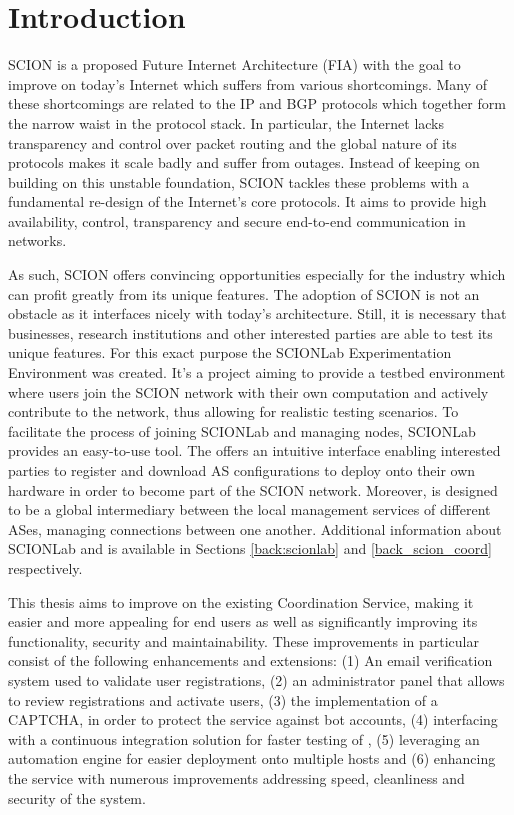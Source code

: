 \chapter{Introduction}

 SCION \cite{scion_book} is a proposed Future Internet Architecture (FIA) with the goal to improve on today's Internet which suffers from various shortcomings. Many of these shortcomings are related to the IP and BGP protocols which together form the narrow waist in the protocol stack. In particular, the Internet lacks transparency and control over packet routing and the global nature of its protocols makes it scale badly and suffer from outages. Instead of keeping on building on this unstable foundation, SCION tackles these problems with a fundamental re-design of the Internet's core protocols. It aims to provide 
 high availability, control, transparency and secure end-to-end communication in networks. \cite{scion_5yrs}
 
 As such, SCION offers convincing opportunities especially for the industry which can profit greatly from its unique features. 
 The adoption of SCION is not an obstacle as it interfaces nicely with today's architecture. Still, it is necessary that businesses, research institutions and other interested parties are able to test its unique features. For this exact purpose the SCIONLab Experimentation Environment was created. It's a project aiming to provide a testbed environment where users join the SCION network with their own computation and actively contribute to the network, thus allowing for realistic testing scenarios. To facilitate the process of joining SCIONLab and managing nodes, SCIONLab provides an easy-to-use tool. The \lcs offers an intuitive interface enabling interested parties to register and download AS configurations to deploy onto their own hardware in order to become part of the SCION network. Moreover, \lcs is designed to be a global intermediary between the local management services of different ASes, managing connections between one another. Additional information about SCIONLab and \lcs is available in Sections \ref{back:scionlab} and \ref{back_scion_coord} respectively.
  
 This thesis aims to improve on the existing Coordination Service, making it easier and more appealing for end users as well as significantly improving its functionality, security and maintainability. These improvements in particular consist of the following enhancements and extensions: (1) An email verification system used to validate user registrations, (2) an administrator panel that allows to review registrations and activate users, (3) the implementation of a CAPTCHA, in order to protect the service against bot accounts, (4) interfacing with a continuous integration solution for faster testing of \lcs, (5) leveraging an automation engine for easier deployment onto multiple hosts and (6) enhancing the service with numerous improvements addressing speed, cleanliness and security of the system.

